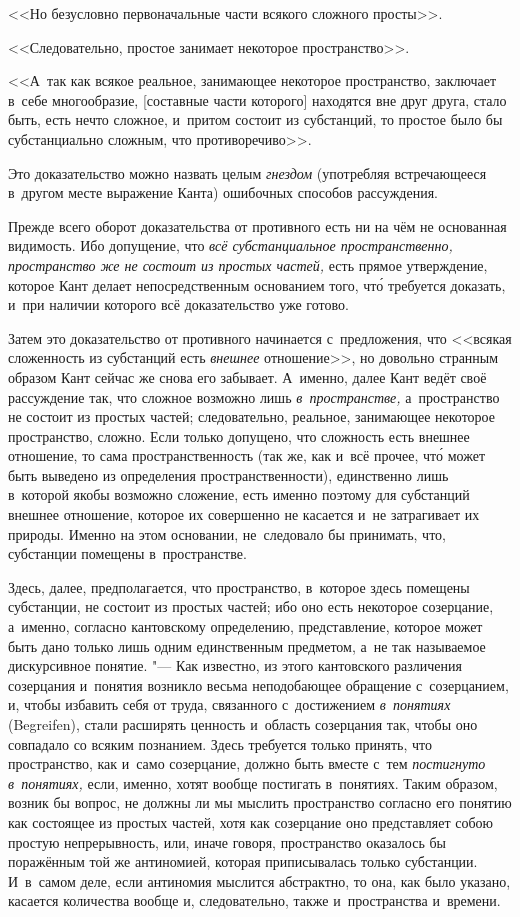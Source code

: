 <<Но безусловно первоначальные части всякого сложного просты>>.

<<Следовательно, простое занимает некоторое пространство>>.

<<А~так как всякое реальное, занимающее некоторое пространство, заключает
в~себе многообразие, [составные части которого] находятся вне друг друга,
стало быть, есть нечто сложное, и~притом состоит из субстанций, то простое
было бы субстанциально сложным, что противоречиво>>.

Это доказательство можно назвать целым {\em гнездом} (употребляя встречающееся
в~другом месте выражение Канта) ошибочных способов рассуждения.

Прежде всего оборот доказательства от противного есть ни на чём не основанная
видимость. Ибо допущение, что {\em всё субстанциальное пространственно,
пространство же не состоит из простых частей,} есть прямое утверждение,
которое Кант делает непосредственным основанием того, чт\'{о} требуется
доказать, и~при наличии которого всё доказательство уже готово.

Затем это доказательство от противного начинается с~предложения, что <<всякая
сложенность из субстанций есть {\em внешнее} отношение>>, но довольно странным
образом Кант сейчас же снова его забывает. А~именно, далее Кант ведёт своё
рассуждение так, что сложное возможно лишь {\em в~пространстве,} а~пространство
не состоит из простых частей; следовательно, реальное, занимающее некоторое
пространство, сложно. Если только допущено, что сложность есть внешнее
отношение, то сама пространственность (так же, как и~всё прочее, чт\'{о} может
быть выведено из определения пространственности), единственно лишь в~которой
якобы возможно сложение, есть именно поэтому для субстанций внешнее отношение,
которое их совершенно не касается и~не затрагивает их природы. Именно на этом
основании, не~следовало бы принимать, что, субстанции помещены в~пространстве.

Здесь, далее, предполагается, что пространство, в~которое здесь помещены
субстанции, не состоит из простых частей; ибо оно есть некоторое созерцание,
а~именно, согласно кантовскому определению, представление, которое может быть
дано только лишь одним единственным предметом, а~не так называемое дискурсивное
понятие. "--- Как известно, из этого кантовского различения созерцания
и~понятия возникло весьма неподобающее обращение с~созерцанием, и, чтобы
избавить себя от труда, связанного с~достижением {\em в~понятиях} (Begreifen),
стали расширять ценность и~область созерцания так, чтобы оно совпадало со
всяким познанием. Здесь требуется только принять, что пространство, как и~само
созерцание, должно быть вместе с~тем {\em постигнуто в~понятиях,} если, именно,
хотят вообще постигать в~понятиях. Таким образом, возник бы вопрос, не должны
ли мы мыслить пространство согласно его понятию как состоящее из простых
частей, хотя как созерцание оно представляет собою простую непрерывность, или,
иначе говоря, пространство оказалось бы поражённым той же антиномией, которая
приписывалась только субстанции. И~в~самом деле, если антиномия мыслится
абстрактно, то она, как было указано, касается количества вообще и,
следовательно, также и~пространства и~времени.

